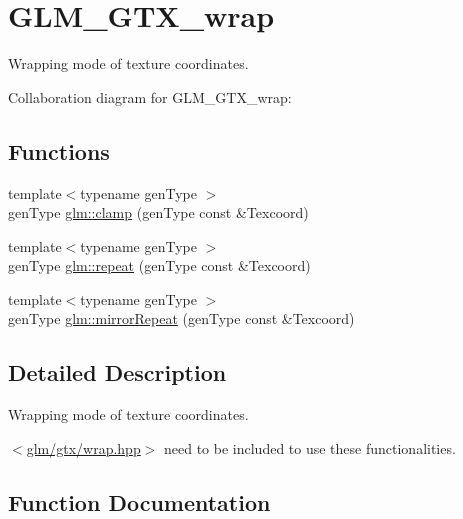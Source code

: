 \hypertarget{group__gtx__wrap}{}\section{G\+L\+M\+\_\+\+G\+T\+X\+\_\+wrap}
\label{group__gtx__wrap}


Wrapping mode of texture coordinates.  


Collaboration diagram for G\+L\+M\+\_\+\+G\+T\+X\+\_\+wrap\+:
\subsection*{Functions}
\begin{DoxyCompactItemize}
\item 
{\footnotesize template$<$typename gen\+Type $>$ }\\gen\+Type \hyperlink{group__gtx__wrap_gaae74b7519ef59ecdd72697db94d130f7}{glm\+::clamp} (gen\+Type const \&Texcoord)
\item 
{\footnotesize template$<$typename gen\+Type $>$ }\\gen\+Type \hyperlink{group__gtx__wrap_gae841d5a9607e9e306b39f79e533b406c}{glm\+::repeat} (gen\+Type const \&Texcoord)
\item 
{\footnotesize template$<$typename gen\+Type $>$ }\\gen\+Type \hyperlink{group__gtx__wrap_ga5ebbf9029b98578fcaa682939ced093a}{glm\+::mirror\+Repeat} (gen\+Type const \&Texcoord)
\end{DoxyCompactItemize}


\subsection{Detailed Description}
Wrapping mode of texture coordinates. 

$<$\hyperlink{wrap_8hpp}{glm/gtx/wrap.\+hpp}$>$ need to be included to use these functionalities. 

\subsection{Function Documentation}
\hypertarget{group__gtx__wrap_gaae74b7519ef59ecdd72697db94d130f7}{}
